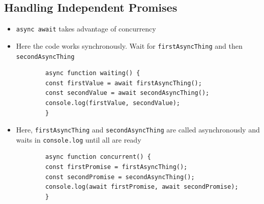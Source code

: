 \documentclass[12pt]{article}
\begin{document}
\subsection{Handling Independent Promises}
\begin{itemize}
    \item \texttt{async await} takes advantage of concurrency
    \item Here the code works synchronously. Wait for \texttt{firstAsyncThing} and then \texttt{secondAsyncThing}
    \begin{lstlisting}
        async function waiting() {
        const firstValue = await firstAsyncThing();
        const secondValue = await secondAsyncThing();
        console.log(firstValue, secondValue);
        }
    \end{lstlisting}

    \item Here, \texttt{firstAsyncThing} and \texttt{secondAsyncThing} are called
    asynchronously and waits in \texttt{console.log} until all are ready
    \begin{lstlisting}
        async function concurrent() {
        const firstPromise = firstAsyncThing();
        const secondPromise = secondAsyncThing();
        console.log(await firstPromise, await secondPromise);
        }
    \end{lstlisting}

\end{itemize}
\end{document}
